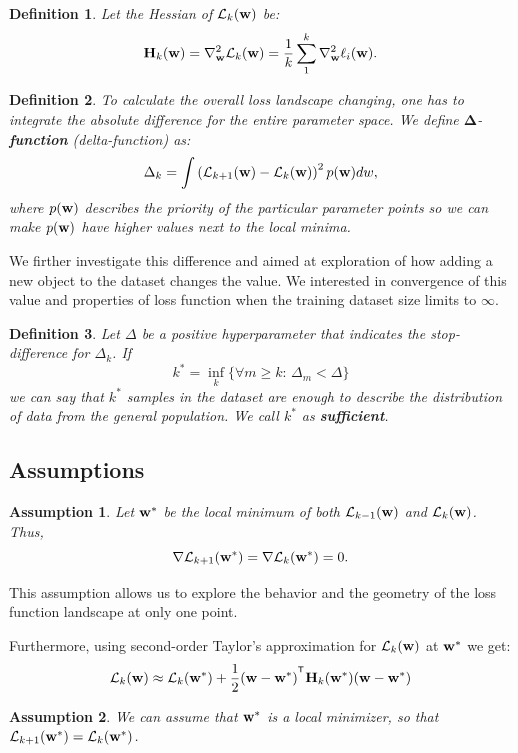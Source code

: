 \documentclass{article}
\newtheorem{definition}{Definition}
\newtheorem{assumption}{Assumption}
\begin{document}
\begin{definition}
  Let the Hessian of $\mathcal{L}_k(\mathbf{w})$ be:
  $$\mathbf{H}_k(\mathbf{w}) = \nabla^2_{\mathbf{w}}\mathcal{L}_k(\mathbf{w}) = \frac1k \sum\limits_1^k \nabla^2_{\mathbf{w}} \ell_i(\mathbf{w}).$$
\end{definition}

\begin{definition}
  To calculate the overall loss landscape changing, one has to integrate the absolute difference for the entire parameter space.
  We define $\mathbf{\Delta}$-\textbf{function} (delta-function) as:
  $$\Delta_{k} = \int \left( \mathcal{L}_{k+1}(\mathbf{w}) - \mathcal{L}_{k}(\mathbf{w}) \right)^2 p(\mathbf{w}) dw,$$
  where $p(\mathbf{w})$ describes the priority of the particular parameter points so we can make $p(\mathbf{w})$ have higher values
  next to the local minima.
\end{definition}

We firther investigate this difference and aimed at exploration of how adding a new object to the dataset changes the value.
We interested in convergence of this value and properties of loss function when the training dataset size limits to $\infty$.

\begin{definition}
  Let $\Delta$ be a positive hyperparameter that indicates the stop-difference for $\Delta_k$. If
  $$k^* = \inf\limits_k\{\forall m \geq k: \, \Delta_m < \Delta\}$$
  we can say that $k^*$ samples in the dataset are enough to describe the distribution of data from the general population.
  We call $k^*$ as \textbf{sufficient}.
\end{definition}

\subsection{Assumptions}

\begin{assumption}
  Let $\mathbf{w}^*$ be the local minimum of both $\mathcal{L}_{k-1}(\mathbf{w})$ and $\mathcal{L}_{k}(\mathbf{w})$.
  Thus, $$\nabla \mathcal{L}_{k+1}(\mathbf{w}^*) = \nabla \mathcal{L}_{k}(\mathbf{w}^*) = 0.$$
\end{assumption}

This assumption allows us to explore the behavior and the geometry of the loss function landscape at only one point.

Furthermore, using second-order Taylor's approximation for $\mathcal{L}_{k}(\mathbf{w})$ at $\mathbf{w}^*$ we get:
$$\cL_{k}(\bw) \approx \cL_{k}(\bw^*) + \frac12 (\bw - \bw^*)^{\T} \bH_k(\bw^*)(\bw - \bw^*)$$

\begin{assumption}
  We can assume that $\mathbf{w}^*$ is a local minimizer, so that $\mathcal{L}_{k+1}(\mathbf{w}^*) = \mathcal{L}_k(\mathbf{w}^*)$.
\end{assumption}
\end{document}
